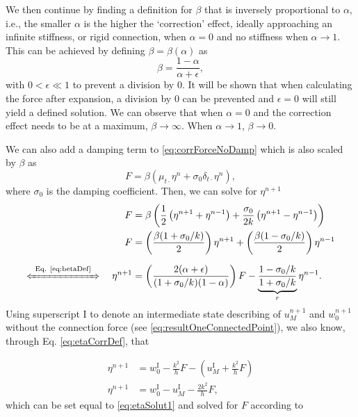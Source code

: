 \documentclass[dvipsnames]{article}
\def\mystrut{\rule[-.2\baselineskip]{0pt}{\baselineskip}}
\begin{document}
We then continue by finding a definition for $\beta$ that is inversely proportional to $\alpha$, i.e., the smaller $\alpha$ is the higher the `correction' effect, ideally approaching an infinite stiffness, or rigid connection, when $\alpha = 0$ and no stiffness when $\alpha \rightarrow 1$. This can be achieved by defining $\beta = \beta(\alpha)$ as
\def\plusEps{+ \epsilon}
\def\alfPlusEps{(\alpha \plusEps)}
\begin{equation}\label{eq:betaDef}
    \beta = \frac{1 - \alpha}{\alpha \plusEps},
\end{equation}
with $0<\epsilon \ll 1$ to prevent a division by 0. It will be shown that when calculating the force after expansion, a division by 0 can be prevented and $\epsilon = 0$ will still yield a defined solution. We can observe that when $\alpha = 0$ and the correction effect needs to be at a maximum, $\beta\rightarrow \infty$. When $\alpha \rightarrow 1$, $\beta \rightarrow 0$.

We can also add a damping term to \eqref{eq:corrForceNoDamp} which is also scaled by $\beta$ as
\begin{equation}\label{eq:corrForce}
    F = \beta \left(\mu_{t\cdot}\eta^n +\sigma_0\delta_{t\cdot}\eta^n \right),
\end{equation}
where $\sigma_0$ is the damping coefficient. Then, we can solve for $\eta^{n+1}$ 
\begin{align}
    F &= \beta\left(\frac{1}{2}\left(\eta^{n+1}+\eta^{n-1}\right) + \frac{\sigma_0}{2k}\left(\eta^{n+1}-\eta^{n-1}\right)\right)\nonumber\\
    F&= \left(\frac{\beta (1 + \sigma_0/k)}{2}\right)\eta^{n+1} + \left(\frac{\beta (1 - \sigma_0/k)}{2}\right) \eta^{n-1}\nonumber\\
    \xLeftrightarrow{\mystrut\ \text{Eq. \eqref{eq:betaDef}}\ } \quad \eta^{n+1} &= \left(\frac{2
    \alfPlusEps}{(1+\sigma_0/k)(1-\alpha)}\right)F - \underbrace{\frac{1-\sigma_0/k}{1+\sigma_0/k}}_{r}\eta^{n-1}.\label{eq:etaSolut1}
\end{align}
Using superscript $\text{I}$ to denote an intermediate state describing of $u^{n+1}_M$ and $w^{n+1}_0$ without the connection force (see \eqref{eq:resultOneConnectedPoint}), we also know, through Eq. \eqref{eq:etaCorrDef}, that 

\begin{align}
    \eta^{n+1} &= w_0^\text{I}-\frac{k^2}{h}F-\left(u_M^\text{I}+\frac{k^2}{h}F\right)\nonumber\\
    \eta^{n+1} &= w_0^\text{I} - u_M^\text{I} - \frac{2k^2}{h}F,\label{eq:etaNext}
\end{align}
which can be set equal to \eqref{eq:etaSolut1} and solved for $F$ according to 
\end{document}
